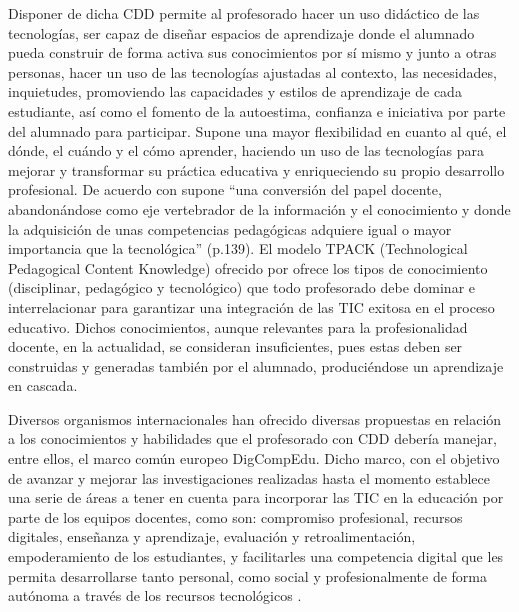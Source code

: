 \documentclass[spanish]{textolivre}
\begin{document}
Disponer de dicha CDD permite al profesorado hacer un uso didáctico de las tecnologías, ser capaz de diseñar espacios de aprendizaje donde el alumnado pueda construir de forma activa sus conocimientos por sí mismo y junto a otras personas, hacer un uso de las tecnologías ajustadas al contexto, las necesidades, inquietudes, promoviendo las capacidades y estilos de aprendizaje de cada estudiante, así como el fomento de la autoestima, confianza e iniciativa por parte del alumnado para participar. Supone una mayor flexibilidad en cuanto al qué, el dónde, el cuándo y el cómo aprender, haciendo un uso de las tecnologías para mejorar y transformar su práctica educativa y enriqueciendo su propio desarrollo profesional. De acuerdo con \textcite{barroso2019} supone “una conversión del papel docente, abandonándose como eje vertebrador de la información y el conocimiento y donde la adquisición de unas competencias pedagógicas adquiere igual o mayor importancia que la tecnológica” (p.139). El modelo TPACK (Technological Pedagogical Content Knowledge) ofrecido por \textcite{koehler2008} ofrece los tipos de conocimiento (disciplinar, pedagógico y tecnológico) que todo profesorado debe dominar e interrelacionar para garantizar una integración de las TIC exitosa en el proceso educativo. Dichos conocimientos, aunque relevantes para la profesionalidad docente, en la actualidad, se consideran insuficientes, pues estas deben ser construidas y generadas también por el alumnado, produciéndose un aprendizaje en cascada.

Diversos organismos internacionales han ofrecido diversas propuestas en relación a los conocimientos y habilidades que el profesorado con CDD debería manejar, entre ellos, el marco común europeo DigCompEdu. Dicho marco, con el objetivo de avanzar y mejorar las investigaciones realizadas hasta el momento establece una serie de áreas a tener en cuenta para incorporar las TIC en la educación por parte de los equipos docentes, como son: compromiso profesional, recursos digitales, enseñanza y aprendizaje, evaluación y retroalimentación, empoderamiento de los estudiantes, y facilitarles una competencia digital que les permita desarrollarse  tanto personal, como social y profesionalmente de forma autónoma a través de los recursos tecnológicos \cite{cabero-almenara2020, colas-bravo2019}.
\end{document}
